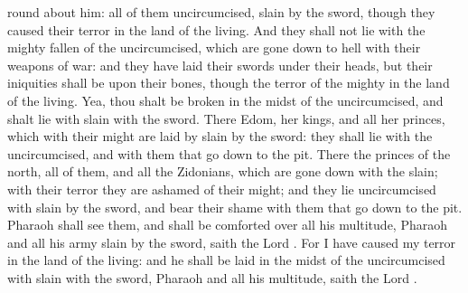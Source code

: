 {{} round
about him: all of them
uncircumcised,
slain by the
sword, though they
caused their
terror in the
land of the
living.
And they shall not
lie with the
mighty
{}
fallen of the
uncircumcised, which are gone
down to
hell with their
weapons of
war: and they have
laid their
swords under their
heads, but their
iniquities shall be upon their
bones, though
{} the
terror of the
mighty in the
land of the
living.
Yea, thou shalt be
broken in the
midst of the
uncircumcised, and shalt
lie with
{}
slain with the
sword.
There
{}
Edom, her
kings, and all her
princes, which with their
might are
laid by
{}
slain by the
sword: they shall
lie with the
uncircumcised, and with them that go
down to the
pit.
There
{} the
princes of the
north, all of them, and all the
Zidonians, which are gone
down with the
slain; with their
terror they are
ashamed of their
might; and they
lie
uncircumcised with
{}
slain by the
sword, and
bear their
shame with them that go
down to the
pit.
Pharaoh shall
see them, and shall be
comforted over all his
multitude,
{}
Pharaoh and all his
army
slain by the
sword,
saith the
Lord
{}.
For I have
caused my
terror in the
land of the
living: and he shall be
laid in the
midst of the
uncircumcised with
{}
slain with the
sword,
{}
Pharaoh and all his
multitude,
saith the
Lord
{}.

}
